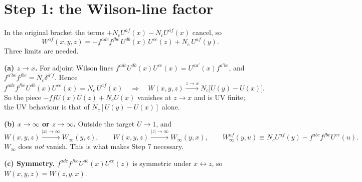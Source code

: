 \documentclass[11pt,a4paper]{article}
\newcommand{\Nc}{N_c}
\newcommand{\Winf}{W_\infty}
\begin{document}
\section{Step 1: the Wilson-line factor}
In the original bracket the terms $+\Nc U^{af}(x)-\Nc U^{af}(x)$ cancel, so
\begin{equation}
W^{af}(x,y,z)=-f^{adc}f^{fbe}\,U^{db}(x)\,U^{ce}(z)+\Nc\,U^{af}(y).
\end{equation}
Three limits are needed.

\textbf{(a) $z\to x$.} For adjoint Wilson lines $f^{adc}U^{db}(x)U^{ce}(x)=U^{aa'}(x)f^{a'be}$, and
$f^{a'be}f^{fbe}=\Nc\delta^{a'f}$. Hence
\begin{equation}
f^{adc}f^{fbe}U^{db}(x)U^{ce}(x)=\Nc\,U^{af}(x)\quad\Longrightarrow\quad
W(x,y,z)\xrightarrow{z\to x}\Nc\big[U(y)-U(x)\big].
\label{eq:Wuv}
\end{equation}
So the piece $-ffU(x)U(z)+\Nc U(x)$ vanishes at $z\to x$ and is UV finite; the UV behaviour is that
of $\Nc[U(y)-U(x)]$ alone.

\textbf{(b) $x\to\infty$ or $z\to\infty$.} Outside the target $U\to1$, and
\begin{equation}
W(x,y,z)\xrightarrow{|x|\to\infty}\Winf(y,z),\qquad
W(x,y,z)\xrightarrow{|z|\to\infty}\Winf(y,x),\qquad
\Winf^{af}(y,u)\equiv\Nc U^{af}(y)-f^{abc}f^{fbe}U^{ce}(u).
\label{eq:Winf}
\end{equation}
$\Winf$ does \emph{not} vanish. This is what makes Step 7 necessary.

\textbf{(c) Symmetry.} $f^{adc}f^{fbe}U^{db}(x)U^{ce}(z)$ is symmetric under $x\leftrightarrow z$,
so $W(x,y,z)=W(z,y,x)$.

\end{document}
